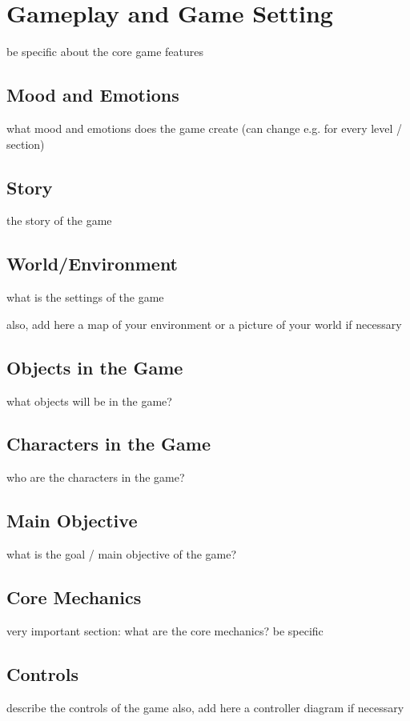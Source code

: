 \chapter{Gameplay and Game Setting}
be specific about the core game features 

\section{Mood and Emotions}
what mood and emotions does the game create (can change e.g. for every level / section) 

\section{Story}
the story of the game

\section{World/Environment}
what is the settings of the game 

also, add here a map of your environment or a picture of your world if necessary

\section{Objects in the Game}
what objects will be in the game?

\section{Characters in the Game}
who are the characters in the game?

\section{Main Objective}
what is the goal / main objective of the game?

\section{Core Mechanics}
very important section: what are the core mechanics? be specific

\section{Controls}
describe the controls of the game 
also, add here a controller diagram if necessary 
